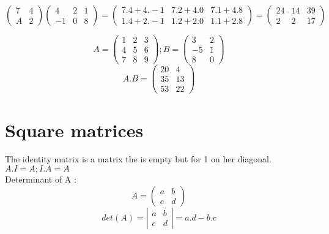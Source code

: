 \documentclass{article}
\begin{document}
    \[
    \left(\begin{array}{cc}
        7 & 4\\
        A & 2
    \end{array} \right)
    \left(\begin{array}{ccc}
        4 & 2 & 1\\
        -1 & 0 & 8
    \end{array} \right)
    =
    \left(\begin{array}{ccc}
        7.4 + 4.-1 & 7.2+4.0 & 7.1+4.8\\
        1.4+2.-1 & 1.2+2.0 & 1.1+2.8
    \end{array} \right)
    =
    \left(\begin{array}{ccc}
        24 & 14 & 39\\
        2 & 2 & 17
    \end{array} \right)
    \]

    \[
    A= \left(\begin{array}{ccc}
        1 & 2 & 3\\
        4 & 5 & 6\\
        7 & 8 & 9
    \end{array} \right)
    ; B =
    \left(\begin{array}{cc}
        3 & 2\\
        -5 & 1\\
        8 & 0
    \end{array} \right)
    \]
    \[
        A.B =
        \left(\begin{array}{cc}
            20 & 4\\
            35 & 13\\
            53 & 22
        \end{array} \right)
    \]

    \section{Square matrices}
    The identity matrix is a matrix the is empty but for 1 on her diagonal.\\
    $A.I= A ; I.A = A$\\
    Determinant of A :
    \[
    A=
    \left(\begin{array}{cc}
        a & b \\
        c & d
    \end{array} \right)
    \]
    \[
    det(A)=
    \left|\begin{array}{cc}
        a & b \\
        c & d
    \end{array} \right|
    = a.d - b.c
    \]
\end{document}
